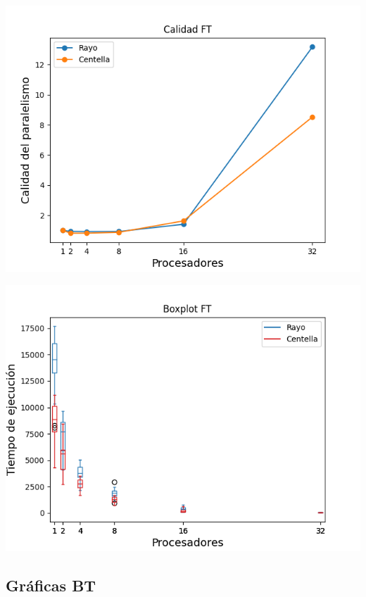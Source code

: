 \begin{center}
 \centering
 \begin{minipage}[b]{.49\textwidth}
  \includegraphics[width=1\linewidth]{plots/calidad-ft.png}
 \end{minipage}
 \begin{minipage}[b]{.49\textwidth}
  \includegraphics[width=1\linewidth]{plots/boxplot-ft.png}
 \end{minipage}
\end{center}

\newpage

\subsection{Gráficas BT}

